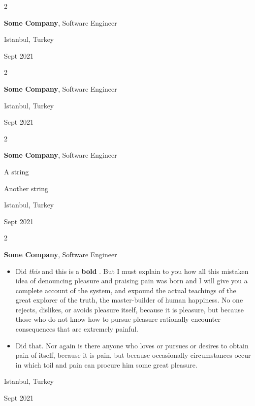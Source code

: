 \documentclass[10pt, letterpaper]{article}
\newenvironment{summary}{
    \begin{description}[
        topsep=0.10 cm,
        parsep=0.10 cm,
        partopsep=0pt,
        itemsep=0pt,
        leftmargin=0.4 cm + 10pt
    ]
}{
    \end{description}
} %
\newenvironment{highlights}{
    \begin{itemize}[
        topsep=0.10 cm,
        parsep=0.10 cm,
        partopsep=0pt,
        itemsep=0pt,
        leftmargin=0.4 cm + 10pt
    ]
}{
    \end{itemize}
} %
\newenvironment{twocolentry}[2][]{
    \onecolentry
    \def\secondColumn{#2}
    \setcolumnwidth{\fill, 4.5 cm}
    \begin{paracol}{2}
}{
    \switchcolumn \raggedleft \secondColumn
    \end{paracol}
    \endonecolentry
} %
\let\hrefWithoutArrow\href
\renewcommand{\href}[2]{\hrefWithoutArrow{#1}{\ifthenelse{\equal{#2}{}}{ }{#2 }\raisebox{.15ex}{\footnotesize \faExternalLink*}}}
\begin{document}
        \vspace{0.2 cm}

        \begin{twocolentry}{
            Istanbul, Turkey

        Sept 2021
        }
            \textbf{Some \textnormal{Company}}, Software Engineer
        \end{twocolentry}


        \vspace{0.2 cm}

        \begin{twocolentry}{
            Istanbul, Turkey

        Sept 2021
        }
            \textbf{Some \textnormal{Company}}, Software Engineer
        \end{twocolentry}


        \vspace{0.2 cm}

        \begin{twocolentry}{
            Istanbul, Turkey

        Sept 2021
        }
            \textbf{Some \textnormal{Company}}, Software Engineer
            \begin{summary}
                \item A string
                \item Another string
            \end{summary}
        \end{twocolentry}


        \vspace{0.2 cm}

        \begin{twocolentry}{
            Istanbul, Turkey

        Sept 2021
        }
            \textbf{Some \textnormal{Company}}, Software Engineer
            \begin{highlights}
                \item Did \textit{this} and this is a \textbf{bold} \href{https://example.com}{link}. But I must explain to you how all this mistaken idea of denouncing pleasure and praising pain was born and I will give you a complete account of the system, and expound the actual teachings of the great explorer of the truth, the master-builder of human happiness. No one rejects, dislikes, or avoids pleasure itself, because it is pleasure, but because those who do not know how to pursue pleasure rationally encounter consequences that are extremely painful.
                \item Did that. Nor again is there anyone who loves or pursues or desires to obtain pain of itself, because it is pain, but because occasionally circumstances occur in which toil and pain can procure him some great pleasure.
            \end{highlights}
        \end{twocolentry}
\end{document}
